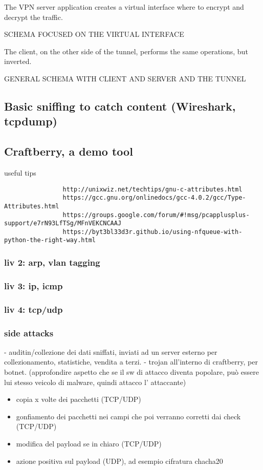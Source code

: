 \documentclass[]{article}
\begin{document}
	The VPN server application creates a virtual interface where to encrypt and decrypt the traffic.

	SCHEMA FOCUSED ON THE VIRTUAL INTERFACE

	The client, on the other side of the tunnel, performs the same operations, but inverted. 

	GENERAL SCHEMA WITH CLIENT AND SERVER AND THE TUNNEL

	\subsection{Basic sniffing to catch content (Wireshark, tcpdump)}
	\subsection{Craftberry, a demo tool}
			useful tips
			\begin{verbatim}
				http://unixwiz.net/techtips/gnu-c-attributes.html
				https://gcc.gnu.org/onlinedocs/gcc-4.0.2/gcc/Type-Attributes.html
				https://groups.google.com/forum/#!msg/pcapplusplus-support/e7rN93LfTSg/MFnVEKCNCAAJ
				https://byt3bl33d3r.github.io/using-nfqueue-with-python-the-right-way.html
			\end{verbatim}
			
			\subsubsection{liv 2: arp, vlan tagging}
			\subsubsection{liv 3: ip, icmp}
			\subsubsection{liv 4: tcp/udp}
			\subsubsection{side attacks}
				- auditin/collezione dei dati sniffati, inviati ad un server esterno per collezionamento, statistiche, vendita a terzi.
				- trojan all'interno di craftberry, per botnet. (approfondire aspetto che se il sw di attacco diventa popolare, può essere lui stesso veicolo di malware, quindi attacco l' attaccante)
			
			\begin{itemize}
				\item copia x volte dei pacchetti (TCP/UDP)
				\item gonfiamento dei pacchetti nei campi che poi verranno corretti dai check (TCP/UDP)
				\item modifica del payload se in chiaro (TCP/UDP)
				\item azione positiva sul payload (UDP), ad esempio cifratura chacha20
			\end{itemize}
\end{document}
